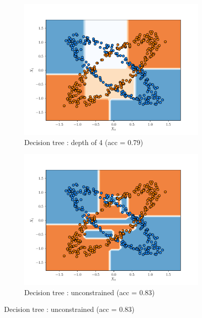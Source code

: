 \begin{figure}[H]
\begin{subfigure}{0.495\textwidth}
        \includegraphics[width=\textwidth]{resources/pdf/make_data2_dt_4.pdf}
        \caption{Decision tree : depth of 4 (acc = \num{0.79})}
    \end{subfigure}
    \begin{subfigure}{0.495\textwidth}
        \includegraphics[width=\textwidth]{resources/pdf/make_data2_dt_None.pdf}
        \caption{Decision tree : unconstrained (acc = \num{0.83})}
    \end{subfigure}
    \label{fig:dt_make_data2}
\end{figure}
